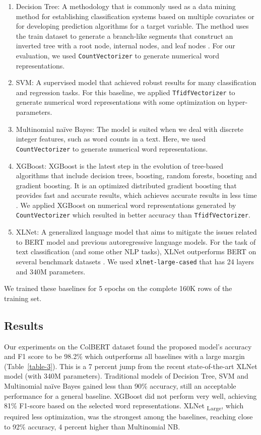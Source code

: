 \documentclass[journal]{IEEEtran}
\begin{document}
\begin{enumerate}
    \item Decision Tree: A methodology that is commonly used as a data mining method for establishing classification systems based on multiple covariates or for developing prediction algorithms for a target variable. The method uses the train dataset to generate a branch-like segments that construct an inverted tree with a root node, internal nodes, and leaf nodes \cite{song2015decision}. For our evaluation, we used \verb+CountVectorizer+ to generate numerical word representations.
    \item SVM: A supervised model that achieved robust results for many classification and regression tasks. For this baseline, we applied \verb+TfidfVectorizer+ to generate numerical word representations with some optimization on hyper-parameters.
    \item Multinomial naïve Bayes: The model is suited when we deal with discrete integer features, such as word counts in a text. Here, we used \verb+CountVectorizer+ to generate numerical word representations.
    \item XGBoost: XGBoost is the latest step in the evolution of tree-based algorithms that include decision trees, boosting, random forests, boosting and gradient boosting. It is an optimized distributed gradient boosting that provides fast and accurate results, which achieves accurate results in less time \cite{chen2016xgboost}. We applied XGBoost on numerical word representations generated by \verb+CountVectorizer+ which resulted in better accuracy than \verb+TfidfVectorizer+.
\item XLNet: A generalized language model that aims to mitigate the issues related to BERT model and previous autoregressive language models. For the task of text classification (and some other NLP tasks), XLNet outperforms BERT on several benchmark datasets \cite{yang2019XLNet}. We used \verb+xlnet-large-cased+ that has 24 layers and 340M parameters.
\end{enumerate}

We trained these baselines for 5 epochs on the complete 160K rows of the training set.


\subsection{Results}

Our experiments on the ColBERT dataset found the proposed model’s accuracy and F1 score to be 98.2\% which outperforms all baselines with a large margin (Table~\ref{table-3}). This is a 7 percent jump from the recent state-of-the-art XLNet model (with 340M parameters). Traditional models of Decision Tree, SVM and Multinomial naïve Bayes gained less than 90\% accuracy, still an acceptable performance for a general baseline. XGBoost did not perform very well, achieving 81\% F1-score based on the selected word representations. XLNet \textsubscript{Large}, which required less optimization, was the strongest among the baselines, reaching close to 92\% accuracy, 4 percent higher than Multinomial NB.
\end{document}
